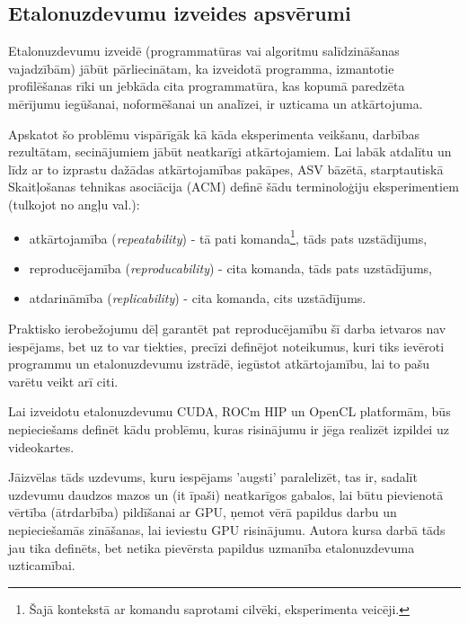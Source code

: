 \begin{center}
    \chapter{Etalonuzdevumu izveides apsvērumi}
\end{center}

Etalonuzdevumu izveidē (programmatūras vai algoritmu salīdzināšanas vajadzībām)
jābūt pārliecinātam, ka izveidotā programma, izmantotie profilēšanas rīki un
jebkāda cita programmatūra, kas kopumā paredzēta mērījumu iegūšanai,
noformēšanai un analīzei, ir uzticama un atkārtojuma.

Apskatot šo problēmu vispārīgāk kā kāda eksperimenta veikšanu, darbības
rezultātam, secinājumiem jābūt neatkarīgi atkārtojamiem. Lai labāk atdalītu un
līdz ar to izprastu dažādas atkārtojamības pakāpes, ASV bāzētā, starptautiskā
Skaitļošanas tehnikas asociācija (ACM) definē šādu terminoloģiju eksperimentiem
(tulkojot no angļu val.):
\cite{acm-experiment-terms}

\begin{itemize}
    \item atkārtojamība (\textit{repeatability}) - tā pati komanda\footnote{Šajā
        kontekstā ar komandu saprotami cilvēki, eksperimenta veicēji.}, tāds
        pats uzstādījums,
    \item reproducējamība (\textit{reproducability}) - cita komanda, tāds pats
        uzstādījums,
    \item atdarināmība (\textit{replicability}) -  cita komanda, cits uzstādījums.
\end{itemize}


Praktisko ierobežojumu dēļ garantēt pat reproducējamību šī darba ietvaros nav
iespējams, bet uz to var tiekties, precīzi definējot noteikumus, kuri tiks
ievēroti programmu un etalonuzdevumu izstrādē, iegūstot atkārtojamību, lai
to pašu varētu veikt arī citi.

Lai izveidotu etalonuzdevumu CUDA, ROCm HIP un OpenCL platformām,
būs nepieciešams definēt kādu problēmu, kuras risinājumu ir jēga realizēt
izpildei uz videokartes.

Jāizvēlas tāds uzdevums, kuru iespējams 'augsti' paralelizēt, tas ir, sadalīt
uzdevumu daudzos mazos un (it īpaši) neatkarīgos gabalos, lai būtu pievienotā
vērtība (ātrdarbība) pildīšanai ar GPU, ņemot vērā papildus darbu un
nepieciešamās zināšanas, lai ieviestu GPU risinājumu. Autora kursa
darbā \cite{kursa-darbs} tāds jau tika definēts, bet netika pievērsta papildus
uzmanība etalonuzdevuma uzticamībai.

